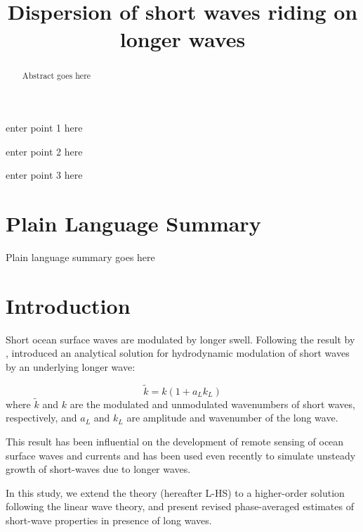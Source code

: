 \documentclass[draft]{agujournal2019}
\begin{document}
\title{Dispersion of short waves riding on longer waves}




\begin{keypoints}
\item enter point 1 here
\item enter point 2 here
\item enter point 3 here
\end{keypoints}

\begin{abstract}
Abstract goes here
\end{abstract}

\section*{Plain Language Summary}
Plain language summary goes here

\section{Introduction}

Short ocean surface waves are modulated by longer swell.
Following the result by ,
 introduced an analytical solution for hydrodynamic
modulation of short waves by an underlying longer wave:

\begin{equation}
\label{eq:tau}
\widetilde{k} = k (1 + a_L k_L)
\end{equation}
where $\widetilde{k}$ and $k$ are the modulated and unmodulated wavenumbers of
short waves, respectively, and $a_L$ and $k_L$ are amplitude and wavenumber
of the long wave.

This result has been influential on the development of remote sensing of ocean
surface waves and currents \cite{keller1975microwave,hara1994hydrodynamic}
and has been used even recently \cite{peureux2021unsteady} to simulate
unsteady growth of short-waves due to longer waves.

In this study, we extend the  theory (hereafter L-HS)
to a higher-order solution following the linear wave theory, and present revised
phase-averaged estimates of short-wave properties in presence of long waves. 
\end{document}
